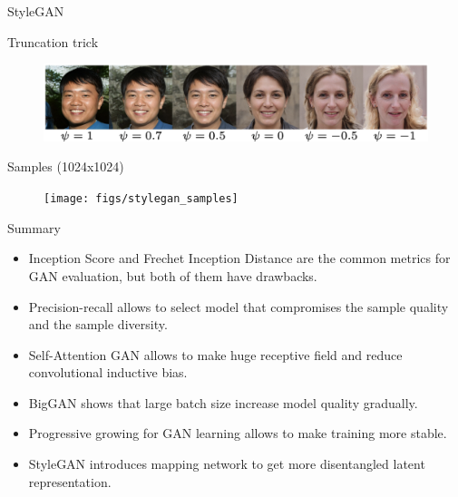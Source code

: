 \begin{frame}{StyleGAN}
	\begin{block}{Truncation trick}
		\begin{figure}
			\centering
			\includegraphics[width=0.85\linewidth]{figs/stylegan_truncation}
		\end{figure}
		\vspace{-0.4cm}
	\end{block}
	\begin{block}{Samples (1024x1024)}
		\begin{figure}
			\centering
			\texttt{[image: figs/stylegan\_samples]}
		\end{figure}
	\end{block}

\end{frame}
\begin{frame}{Summary}
	\begin{itemize}
		\item Inception Score and Frechet Inception Distance are the common metrics for GAN evaluation, but both of them have drawbacks.
		\vfill
		\item Precision-recall allows to select model that compromises the sample quality and the sample diversity.	
		\vfill
		\item Self-Attention GAN allows to make huge receptive field and reduce convolutional inductive bias.
		\vfill
		\item BigGAN shows that large batch size increase model quality gradually.
		\vfill
		\item Progressive growing for GAN learning allows to make training more stable.
		\vfill
		\item StyleGAN introduces mapping network to get more disentangled latent representation.
	\end{itemize}
\end{frame}
 